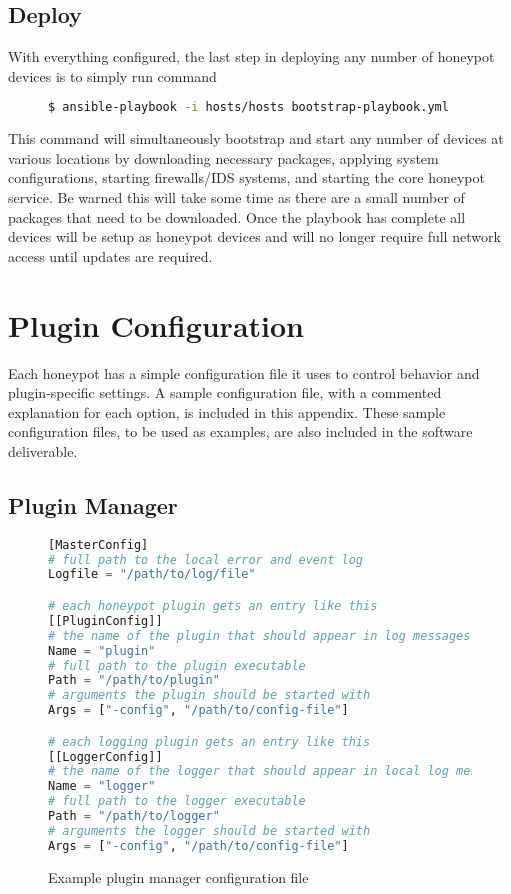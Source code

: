 \subsection{Deploy}
With everything configured, the last step in deploying any number of honeypot devices is to simply run command

\begin{figure}[H]
\small
\begin{lstlisting}[language=Bash,frame=single]
$ ansible-playbook -i hosts/hosts bootstrap-playbook.yml
\end{lstlisting}
\end{figure}

This command will simultaneously bootstrap and start any number of devices at various locations by downloading necessary packages, applying system configurations, starting firewalls/IDS systems, and starting the core honeypot service. Be warned this will take some time as there are a small number of packages that need to be downloaded. Once the playbook has complete all devices will be setup as honeypot devices and will no longer require full network access until updates are required.

\section{Plugin Configuration}

Each honeypot has a simple configuration file it uses to control behavior and
plugin-specific settings. A sample configuration file, with a commented
explanation for each option, is included in this appendix. These sample
configuration files, to be used as examples, are also included in the
software deliverable.

\subsection{Plugin Manager}

\begin{figure}[H]
\begin{lstlisting}[language=Python,frame=single]
[MasterConfig]
# full path to the local error and event log
Logfile = "/path/to/log/file"

# each honeypot plugin gets an entry like this
[[PluginConfig]]
# the name of the plugin that should appear in log messages
Name = "plugin"
# full path to the plugin executable
Path = "/path/to/plugin"
# arguments the plugin should be started with
Args = ["-config", "/path/to/config-file"]

# each logging plugin gets an entry like this
[[LoggerConfig]]
# the name of the logger that should appear in local log messages
Name = "logger"
# full path to the logger executable
Path = "/path/to/logger"
# arguments the logger should be started with
Args = ["-config", "/path/to/config-file"]
\end{lstlisting}
\caption{Example plugin manager configuration file}
\end{figure}

